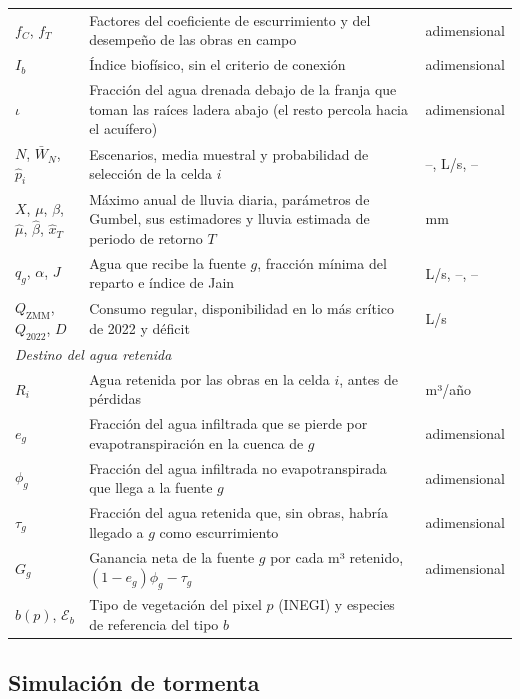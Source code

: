 \documentclass[11pt,letterpaper]{article}
\begin{document}
\begin{table}[H]
\begin{tabularx}{\linewidth}{lXl}
$f_C$, $f_T$ & Factores del coeficiente de escurrimiento y del desempeño de las obras en campo & adimensional \\
$I_b$ & Índice biofísico, sin el criterio de conexión & adimensional \\
$\iota$ & Fracción del agua drenada debajo de la franja que toman las raíces ladera abajo (el resto percola hacia el acuífero) & adimensional \\
$N$, $\bar W_N$, $\hat p_i$ & Escenarios, media muestral y probabilidad de selección de la celda $i$ & --, L/s, -- \\
$X$, $\mu$, $\beta$, $\hat\mu$, $\hat\beta$, $\hat x_T$ & Máximo anual de lluvia diaria, parámetros de Gumbel, sus estimadores y lluvia estimada de periodo de retorno $T$ & mm \\
$q_g$, $\alpha$, $J$ & Agua que recibe la fuente $g$, fracción mínima del reparto e índice de Jain & L/s, --, -- \\
$Q_{\text{ZMM}}$, $Q_{2022}$, $D$ & Consumo regular, disponibilidad en lo más crítico de 2022 y déficit & L/s \\
\multicolumn{3}{l}{\textit{Destino del agua retenida}}\\
$R_i$ & Agua retenida por las obras en la celda $i$, antes de pérdidas & m³/año \\
$e_g$ & Fracción del agua infiltrada que se pierde por evapotranspiración en la cuenca de $g$ & adimensional \\
$\phi_g$ & Fracción del agua infiltrada no evapotranspirada que llega a la fuente $g$ & adimensional \\
$\tau_g$ & Fracción del agua retenida que, sin obras, habría llegado a $g$ como escurrimiento & adimensional \\
$G_g$ & Ganancia neta de la fuente $g$ por cada m³ retenido, $(1-e_g)\phi_g-\tau_g$ & adimensional \\
$b(p)$, $\mathcal E_b$ & Tipo de vegetación del pixel $p$ (INEGI) y especies de referencia del tipo $b$ & \\
\bottomrule
\end{tabularx}
\end{table}

\subsection{Simulación de tormenta}
\end{document}

